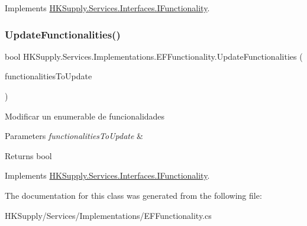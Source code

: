 Implements \hyperlink{interface_h_k_supply_1_1_services_1_1_interfaces_1_1_i_functionality}{H\+K\+Supply.\+Services.\+Interfaces.\+I\+Functionality}.

\mbox{\label{class_h_k_supply_1_1_services_1_1_implementations_1_1_e_f_functionality_a2093874e195260c8963796b45aeba022}} 
\subsubsection{\texorpdfstring{Update\+Functionalities()}{UpdateFunctionalities()}}
{\footnotesize\ttfamily bool H\+K\+Supply.\+Services.\+Implementations.\+E\+F\+Functionality.\+Update\+Functionalities (\begin{DoxyParamCaption}\item[{I\+Enumerable$<$ \hyperlink{class_h_k_supply_1_1_models_1_1_functionality}{Functionality} $>$}]{functionalities\+To\+Update }\end{DoxyParamCaption})}



Modificar un enumerable de funcionalidades 


\begin{DoxyParams}{Parameters}
{\em functionalities\+To\+Update} & \\
\hline
\end{DoxyParams}
\begin{DoxyReturn}{Returns}
bool
\end{DoxyReturn}


Implements \hyperlink{interface_h_k_supply_1_1_services_1_1_interfaces_1_1_i_functionality}{H\+K\+Supply.\+Services.\+Interfaces.\+I\+Functionality}.



The documentation for this class was generated from the following file\+:\begin{DoxyCompactItemize}
\item 
H\+K\+Supply/\+Services/\+Implementations/E\+F\+Functionality.\+cs\end{DoxyCompactItemize}
